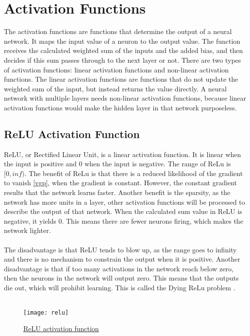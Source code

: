 \section{Activation Functions}
The activation functions are functions that determine the output of a neural network. It maps the input value of a neuron to the output value. The function receives the calculated weighted sum of the inputs and the added bias, and then decides if this sum passes through to the next layer or not.
There are two types of activation functions: linear activation functions and non-linear activation functions. The linear activation functions are functions that do not update the weighted sum of the input, but instead returns the value directly. A neural network with multiple layers needs non-linear activation functions, because linear activation functions would make the hidden layer in that network purposeless. 

\subsection{ReLU Activation Function}
ReLU, or Rectified Linear Unit, is a linear activation function. It is linear when the input is positive and 0 when the input is negative. The range of ReLu is $[0, inf)$. The benefit of ReLu is that there is a reduced likelihood of the gradient to vanish \ref{vgp}, when the gradient is constant. However, the constant gradient results that the network learns faster. Another benefit is the sparsity, as the network has more units in a layer, other activation functions will be processed to describe the output of that network. When the calculated sum value in ReLU is negative, it yields 0. This means there are fewer neurons firing, which makes the network lighter.\\\\ 
The disadvantage is that ReLU tends to blow up, as the range goes to infinity and there is no mechanism to constrain the output when it is positive. Another disadvantage is that if too many activations in the network reach below zero, then the neurons in the network will output zero. This means that the outputs die out, which will prohibit learning. This is called the Dying ReLu problem \cite{Dying_ReLU}.\\\\
\begin{figure}
    \texttt{[image: relu]}
    \caption{\href{https://cdn-images-1.medium.com/max/1600/1*DfMRHwxY1gyyDmrIAd-gjQ.png}{ReLU activation function} }
    
\end{figure}



